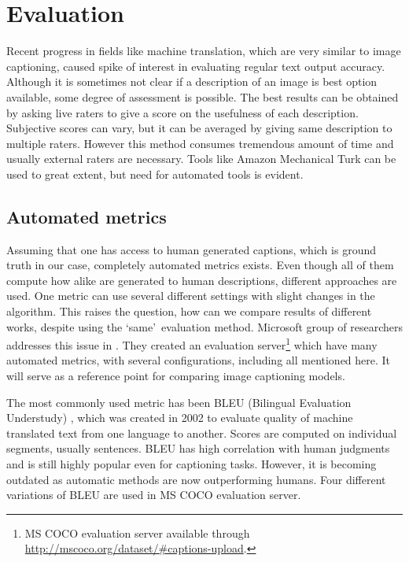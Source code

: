 	\section{Evaluation}
	\label{sec:evaluation}	
Recent progress in fields like machine translation, which are very similar to image captioning, caused spike of interest in evaluating regular text output accuracy. Although it is sometimes not clear if a description of an image is best option available, some degree of assessment is possible. The best results can be obtained by asking live raters to give a score on the usefulness of each description. Subjective scores can vary, but it can be averaged by giving same description to multiple raters. However this method consumes tremendous amount of time and usually external raters are necessary. Tools like Amazon Mechanical Turk can be used to great extent, but need for automated tools is evident.

		\subsection{Automated metrics}
		
Assuming that one has access to human generated captions, which is ground truth in our case, completely automated metrics exists. Even though all of them compute how alike are generated to human descriptions, different approaches are used. One metric can use several different settings with slight changes in the algorithm. This raises the question, how can we compare results of different works, despite using the \textquoteleft same\textquoteright \ evaluation method. Microsoft group of researchers addresses this issue in \cite{DBLP:journals/corr/ChenFLVGDZ15}. They created an evaluation server\footnote{MS COCO evaluation server available through \url{http://mscoco.org/dataset/\#captions-upload}.} which have many automated metrics, with several configurations, including all mentioned here. It will serve as a reference point for comparing image captioning models.
		
The most commonly used metric has been BLEU (Bilingual Evaluation Understudy) \cite{Papineni:2002:BMA:1073083.1073135}, which was created in 2002 to evaluate quality of machine translated text from one language to another. Scores are computed on individual segments, usually sentences. BLEU has high correlation with human judgments and is still highly popular even for captioning tasks. However, it is becoming outdated as automatic methods are now outperforming humans. Four different variations of BLEU are used in MS COCO evaluation server.


